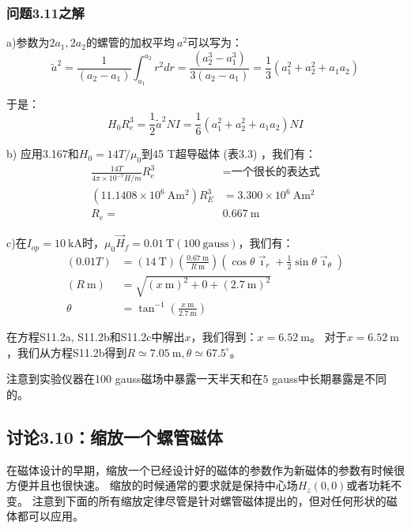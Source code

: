 \subsubsection{问题3.11之解}
a)参数为$2a_1,2a_2$的螺管的加权平均$~{a}^2$可以写为：
\begin{equation*}
\tilde{a}^{2}=\frac{1}{(a_{2}-a_{1})}\int_{a_{1}}^{a_{2}}r^{2}dr=\frac{(a_{2}^{3}-a_{1}^{3})}{3(a_{2}-a_{1})}=\frac{1}{3}(a_{1}^{2}+a_{2}^{2}+a_{1}a_{2})\tag{S11.1}%
\end{equation*}

于是：
\begin{equation*}
H_{0}R_{e}^{3}=\frac{1}{2}\tilde{a}^{2}NI=\frac{1}{6}(a_{1}^{2}+a_{2}^{2}+a_{1}a_{2})NI\tag{3.165}%
\end{equation*}

b) 应用3.167和$H_0=14 T/\mu_0$到45 T超导磁体 (表3.3) ，我们有：
\begin{align*}
\frac{14 T}{4\pi\times 10^{-7}H/m} R_e^3&= \mbox{一个很长的表达式}\\
(11.1408\times 10^6\ \mathrm{Am^2})R_E^3&=3.300\times 10^6\ \mathrm{Am^2} \\
R_e=&0.667\ \mathrm{m}
\end{align*}

c)在$I_{op}=10\ \mathrm{kA}$时，$\mu_0 \vec{H}_f=0.01\ \mathrm{T}(100\ \mathrm{gauss})$，我们有：
\begin{align*}
(0.01T)&=(14\ \mathrm{T})(\frac{0.67\ \mathrm{m}}{R\ \mathrm{m}})(\cos\theta\vec{\imath}_{r}+\frac{1}{2}\sin\theta\vec{\imath}_{\theta})\tag{S11.2a}\\
(R\ \mathrm{m})&=\sqrt{(x\ \mathrm{m})^{2}+0+(2.7\ \mathrm{m})^{2}}\tag{S11.2b}\\%
\theta&=\tan^{-1}(\frac{x\ \mathrm{m}}{2.7\ \mathrm{m}})\tag{S11.2c}%
\end{align*}

在方程S11.2a, S11.2b和S11.2c中解出$x$，我们得到：$x=6.52\ \mathrm{m}$。
对于$x=6.52\ \mathrm{m}$，我们从方程S11.2b得到$R\simeq 7.05\ \mathrm{m}, \theta\simeq 67.5^\circ$。

注意到实验仪器在100 gauss磁场中暴露一天半天和在5 gauss中长期暴露是不同的。



\subsection{讨论3.10：缩放一个螺管磁体}
在磁体设计的早期，缩放一个已经设计好的磁体的参数作为新磁体的参数有时候很方便并且也很快速。
缩放的时候通常的要求就是保持中心场$H_z(0,0)$或者功耗不变。
注意到下面的所有缩放定律尽管是针对螺管磁体提出的，但对任何形状的磁体都可以应用。

